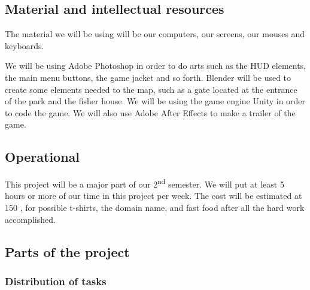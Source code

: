 \documentclass[12pt]{article}
\begin{document}
\subsection{Material and intellectual resources}

The material we will be using will be our computers, our screens, our mouses and keyboards.

We will be using Adobe Photoshop in order to do arts such as the HUD elements, the main menu buttons, the game jacket and so forth. Blender will be used to create some elements needed to the map, such as a gate located at the entrance of the park and the fisher house. We will be using the game engine Unity in order to code the game. We will also use Adobe After Effects to make a trailer of the game.\\

\subsection{Operational}

This project will be a major part of our 2\textsuperscript{nd} semester. We will put at least 5 hours or more of our time in this project per week. The cost will be estimated at 150 \texteuro, for possible t-shirts, the domain name, and fast food after all the hard work accomplished.\\

\subsection{Parts of the project}

\subsubsection{Distribution of tasks}
\end{document}
